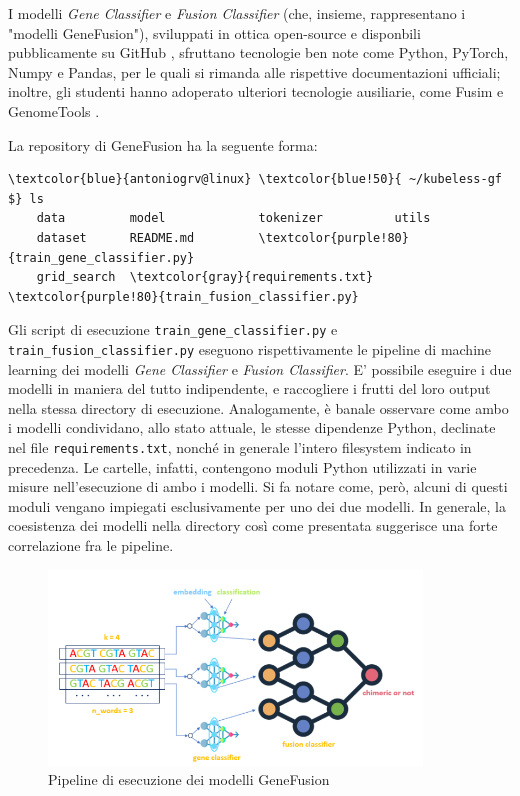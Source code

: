 I modelli {\em Gene Classifier} e {\em Fusion Classifier} (che, insieme, rappresentano i "modelli GeneFusion"), sviluppati in ottica open-source e disponbili pubblicamente su GitHub \cite{kubeless_gf}, sfruttano tecnologie ben note come Python, PyTorch, Numpy e Pandas, per le quali si rimanda alle rispettive documentazioni ufficiali; inoltre, gli studenti hanno adoperato ulteriori tecnologie ausiliarie, come Fusim \cite{fusim} e GenomeTools \cite{gt}.

La repository di GeneFusion ha la seguente forma:

\begin{small}
\begin{Verbatim}[commandchars=\\\{\}]
    \textcolor{blue}{antoniogrv@linux} \textcolor{blue!50}{ ~/kubeless-gf $} ls
    data         model             tokenizer          utils
    dataset      README.md         \textcolor{purple!80}{train_gene_classifier.py}
    grid_search  \textcolor{gray}{requirements.txt}  \textcolor{purple!80}{train_fusion_classifier.py}
\end{Verbatim}
\end{small}

Gli script di esecuzione {\small {\color{purple!80} \verb|train_gene_classifier.py|}} e {\small {\color{purple!80} \verb|train_fusion_classifier.py|}} eseguono rispettivamente le pipeline di machine learning dei modelli {\em Gene Classifier} e {\em Fusion Classifier}. E' possibile eseguire i due modelli in maniera del tutto indipendente, e raccogliere i frutti del loro output nella stessa directory di esecuzione. Analogamente, è banale osservare come ambo i modelli condividano, allo stato attuale, le stesse dipendenze Python, declinate nel file {\small {\color{gray} \verb|requirements.txt|}}, nonché in generale l'intero filesystem indicato in precedenza. Le cartelle, infatti, contengono moduli Python utilizzati in varie misure nell'esecuzione di ambo i modelli. Si fa notare come, però, alcuni di questi moduli vengano impiegati esclusivamente per uno dei due modelli. In generale, la coesistenza dei modelli nella directory così come presentata suggerisce una forte correlazione fra le pipeline.

\begin{figure}[h]
    \centering
    \includegraphics[width=375px]{figures/ch2/genefusion.png}
    \caption[Pipeline di esecuzione dei modelli GeneFusion]{Pipeline di esecuzione dei modelli GeneFusion}
    \label{fig:cha2:gf}
\end{figure}

